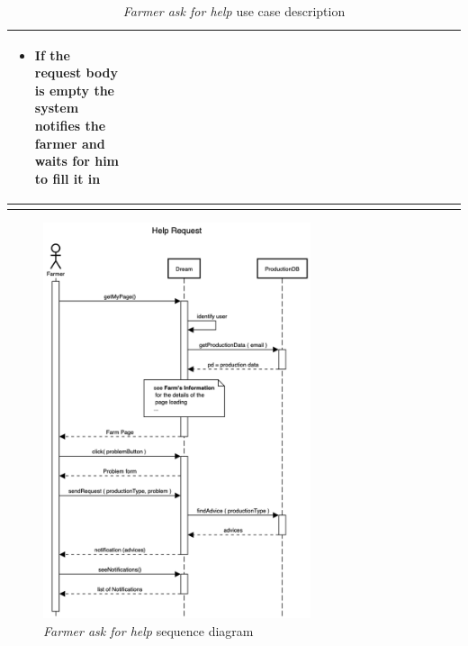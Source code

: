 \begin{enumerate}
\begin{longtable}{p{0.26\linewidth}p{0.75\linewidth}}
\begin{itemize}
            \item If the request body is empty the system notifies the farmer and waits for him to fill it in
        \end{itemize}\\
        \bottomrule
        \caption{\emph{Farmer ask for help} use case description}
    \end{longtable}
    \begin{figure}[H]
        \begin{center}
        \includegraphics[width=0.7\textwidth]{sequence/HelpRequest.png}
        \caption{\emph{Farmer ask for help} sequence diagram}
        \label{fig:sequence6}
        \end{center}
    \end{figure}


\end{enumerate}
